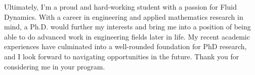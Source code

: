 \documentclass{article}
\begin{document}
Ultimately, I'm a proud and hard-working student with a passion for Fluid Dynamics. With a career in engineering and applied mathematics research in mind, a Ph.D. would further my interests and bring me into a position of being able to do advanced work in engineering fields later in life. My recent academic experiences have culminated into a well-rounded foundation for PhD research, and I look forward to navigating opportunities in the future. Thank you for considering me in your program. 

\end{document}
